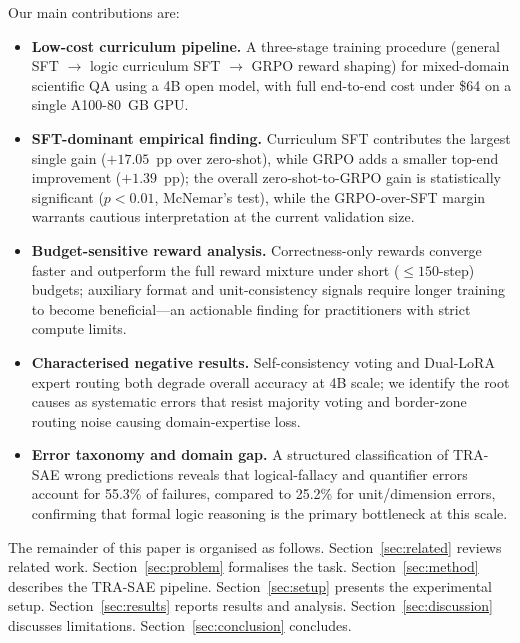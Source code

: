 \documentclass[cmc,journal,article,submit,moreauthors,pdftex]{Definitions/tsp}
\newcommand{\modelname}{\textsc{TRA-SAE}}
\begin{document}
Our main contributions are:
\begin{itemize}
  \item \textbf{Low-cost curriculum pipeline.} A three-stage training
        procedure (general SFT $\to$ logic curriculum SFT $\to$ GRPO
        reward shaping) for mixed-domain scientific QA using a 4B open
        model, with full end-to-end cost under \$64 on a single
        A100-80~GB GPU.

  \item \textbf{SFT-dominant empirical finding.} Curriculum SFT
        contributes the largest single gain ($+17.05$~pp over zero-shot),
        while GRPO adds a smaller top-end improvement ($+1.39$~pp);
        the overall zero-shot-to-GRPO gain is statistically significant
        ($p < 0.01$, McNemar's test), while the GRPO-over-SFT margin
        warrants cautious interpretation at the current validation size.

  \item \textbf{Budget-sensitive reward analysis.} Correctness-only
        rewards converge faster and outperform the full reward mixture
        under short (${\le}150$-step) budgets; auxiliary format and
        unit-consistency signals require longer training to become
        beneficial---an actionable finding for practitioners with strict
        compute limits.

  \item \textbf{Characterised negative results.} Self-consistency voting
        and Dual-LoRA expert routing both degrade overall accuracy at 4B
        scale; we identify the root causes as systematic errors that
        resist majority voting and border-zone routing noise causing
        domain-expertise loss.

  \item \textbf{Error taxonomy and domain gap.} A structured
        classification of \modelname{} wrong predictions reveals that
        logical-fallacy and quantifier errors account for 55.3\% of
        failures, compared to 25.2\% for unit/dimension errors, confirming
        that formal logic reasoning is the primary bottleneck at this scale.
\end{itemize}

The remainder of this paper is organised as follows.
Section~\ref{sec:related} reviews related work.
Section~\ref{sec:problem} formalises the task.
Section~\ref{sec:method} describes the \modelname{} pipeline.
Section~\ref{sec:setup} presents the experimental setup.
Section~\ref{sec:results} reports results and analysis.
Section~\ref{sec:discussion} discusses limitations.
Section~\ref{sec:conclusion} concludes.
\end{document}
